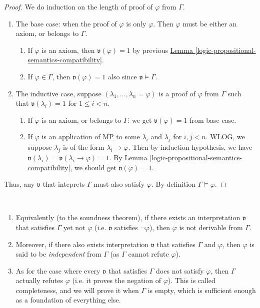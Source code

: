 \documentclass{treatise}
\begin{document}
\begin{proof}
We do induction on the length of proof of $\varphi$ from $\Gamma$.
\begin{enumerate}
    \item The base case: when the proof of $\varphi$ is only $\varphi$. Then $\varphi$ must be either an axiom, or belongs to $\Gamma$.
    \begin{enumerate}
        \item If $\varphi$ is an axiom, then $\mathfrak{v}(\varphi) = 1$ by previous \hyperref[logic-propositional-semantics-compatibility]{Lemma \ref*{logic-propositional-semantics-compatibility}}.
        \item If $\varphi \in \Gamma$, then $\mathfrak{v}(\varphi) = 1$ also since $\mathfrak{v} \vDash \Gamma$.
    \end{enumerate}
    \item The inductive case, suppose $(\lambda_1, \hdots, \lambda_n = \varphi)$ is a proof of $\varphi$ from $\Gamma$ such that $\mathfrak{v}(\lambda_i) = 1$ for $1 \leq i < n$.
    \begin{enumerate}
        \item If $\varphi$ is an axiom, or belongs to $\Gamma$: we get $\mathfrak{v}(\varphi) = 1$ from base case.
        \item If $\varphi$ is an application of \hyperref[HPL-R-MP]{MP} to some $\lambda_i$ and $\lambda_j$ for $i, j < n$. WLOG, we suppose $\lambda_j$ is of the form $\lambda_i \to \varphi$. Then by induction hypothesis, we have $\mathfrak{v}(\lambda_i) = \mathfrak{v}(\lambda_i \to \varphi) = 1$. By \hyperref[logic-propositional-semantics-compatibility]{Lemma \ref*{logic-propositional-semantics-compatibility}}, we should get $\mathfrak{v}(\varphi) = 1$.
    \end{enumerate}
\end{enumerate}
Thus, any $\mathfrak{v}$ that inteprets $\Gamma$ must also satisfy $\varphi$. By definition $\Gamma \vDash \varphi$.
\end{proof}
\begin{remark} \
\begin{enumerate}
	\item Equivalently (to the soundness theorem), if there exists an interpretation $\mathfrak{v}$ that satisfies $\Gamma$ yet not $\varphi$ (i.e. $\mathfrak{v}$ satisfies $\neg \varphi$), then $\varphi$ is not derivable from $\Gamma$.
	\item Moreover, if there also exists interpretation $\mathfrak{v}$ that satisfies $\Gamma$ and $\varphi$, then $\varphi$ is said to be \emph{independent} from $\Gamma$ (as $\Gamma$ cannot refute $\varphi$).
	\item As for the case where every $\mathfrak{v}$ that satisfies $\Gamma$ does not satisfy $\varphi$, then $\Gamma$ actually refutes $\varphi$ (i.e. it proves the negation of $\varphi$). This is called completeness, and we will prove it when $\Gamma$ is empty, which is sufficient enough as a foundation of everything else.
\end{enumerate}
\end{remark}
\end{document}

